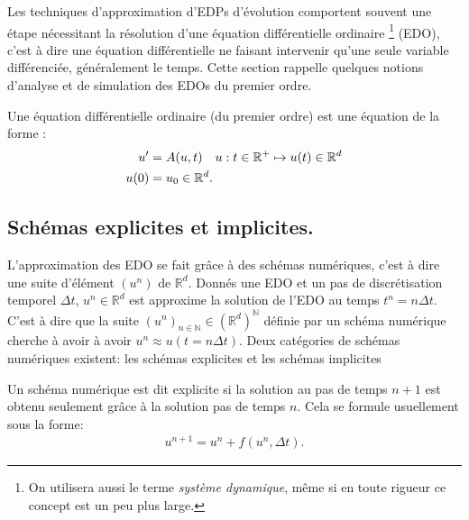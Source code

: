 Les techniques d'approximation d'EDPs d'évolution comportent souvent une étape nécessitant la résolution d'une équation différentielle ordinaire
\footnote{On utilisera aussi le terme \textit{système dynamique}, même si en toute rigueur ce concept est un peu plus large.} (EDO),
c'est à dire une équation différentielle ne faisant intervenir qu'une seule variable différenciée, généralement le temps. Cette section rappelle 
quelques notions d'analyse et de simulation des EDOs du premier ordre.\par

\begin{definition}
    Une équation différentielle ordinaire (du premier ordre) est une équation de la forme :
    \begin{align}\label{def:def_ODE}
        u' &= A(u,t)\quad u : t \in \mathbb{R}^+ \mapsto u(t) \in \mathbb{R}^d\\\notag
        u(0)&=u_0 \in \mathbb{R}^d.
    \end{align}
\end{definition}
\subsection{Schémas explicites et implicites.}
L'approximation des EDO se fait grâce à des schémas numériques, c'est à dire une suite d'élément $(u^n)$ de $\mathbb{R}^d$.
Donnés une EDO et un pas de discrétisation temporel $\Delta t$, $u^n \in \mathbb{R}^d$ est approxime la solution de l'EDO au temps $t^n = n \Delta t$.
C'est à dire que la suite $(u^n)_{n\in \mathbb{N}} \in (\mathbb R^d)^\mathbb{N}$ définie par un schéma numérique cherche à avoir à avoir $u^n \approx u(t=n\Delta t)$.
Deux catégories de schémas numériques existent: les schémas explicites et les schémas implicites


\begin{definition}
    Un schéma numérique est dit explicite si la solution au pas de temps $n+1$ est obtenu seulement grâce à la solution pas de temps $n$. Cela se formule usuellement sous la forme:
    \begin{align}
        u^{n+1} = u^n + f(u^n ,\Delta t ).
    \end{align}
\end{definition}

